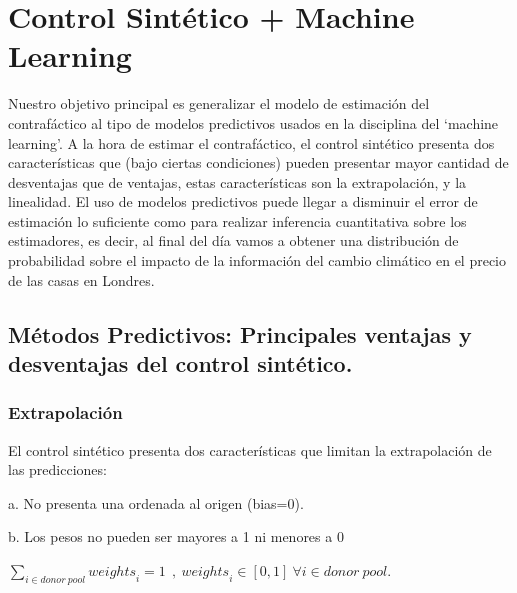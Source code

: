 \documentclass[12pt]{article}
\begin{document}
\section{Control Sintético + Machine Learning}

\label{sec:sint+machine}

Nuestro objetivo principal es generalizar el modelo de estimación del contrafáctico al tipo de modelos predictivos usados en la disciplina del ‘machine learning’. A la hora de estimar el contrafáctico, el control sintético presenta dos características que (bajo ciertas condiciones) pueden presentar mayor cantidad de desventajas que de ventajas, estas características son la extrapolación, y la linealidad. El uso de modelos predictivos puede llegar a disminuir el error de estimación lo suficiente como para realizar inferencia cuantitativa sobre los estimadores, es decir, al final del día vamos a obtener una distribución de probabilidad sobre el impacto de la información del cambio climático en el precio de las casas en Londres.

\subsection{Métodos Predictivos: Principales ventajas y desventajas del control sintético.}
\subsubsection{Extrapolación}
El control sintético presenta dos características que limitan la extrapolación de las predicciones:

a. No presenta una ordenada al origen (bias=0).

b. Los pesos no pueden ser mayores a 1 ni menores a 0
  
  {$\sum_{i\in d o n o r\ pool}{{weights}_i=1\ \ }, \ {weights}_i\in\left[0,1\right]\ \forall i\in donor\ pool $}.
\end{document}
